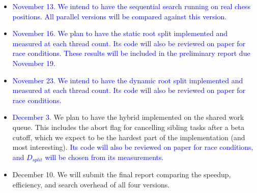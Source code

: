 \documentclass[10pt, conference, compsocconf]{IEEEtran}
\newcommand{\rev}[1]{\textcolor{blue}{#1}}
\begin{document}
\begin{itemize}
\item \rev{November 13. We intend to have the sequential search running on real chess positions. All parallel versions will be compared against this version.}
\item \rev{November 16. We plan to have the static root split implemented and measured at each thread count. Its code will also be reviewed on paper for race conditions. These results will be included in the preliminary report due November 19.}
\item \rev{November 23. We intend to have the dynamic root split implemented and measured at each thread count. Its code will also be reviewed on paper for race conditions.}
\item \rev{December 3.} We plan to have the hybrid implemented on the shared work queue. This includes the abort flag for cancelling sibling tasks after a beta cutoff, which we expect to be the hardest part of the implementation (and most interesting). \rev{Its code will also be reviewed on paper for race conditions, and $D_{split}$ will be chosen from its measurements.}
\item December 10. We will submit the final report comparing the speedup, efficiency, and search overhead of all four versions.
\end{itemize}



\end{document}
